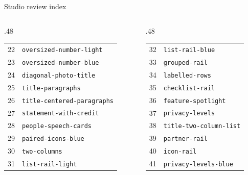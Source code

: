 \documentclass[aspectratio=169]{beamer}
\begin{document}
\begin{frame}{Studio review index}\fontsize{6.5}{9}\selectfont\begin{columns}[T]
\begin{column}{.48\textwidth}\begin{tabular}{rl}
22 & \texttt{oversized-number-light} \\
23 & \texttt{oversized-number-blue} \\
24 & \texttt{diagonal-photo-title} \\
25 & \texttt{title-paragraphs} \\
26 & \texttt{title-centered-paragraphs} \\
27 & \texttt{statement-with-credit} \\
28 & \texttt{people-speech-cards} \\
29 & \texttt{paired-icons-blue} \\
30 & \texttt{two-columns} \\
31 & \texttt{list-rail-light} \\
\end{tabular}\end{column}
\begin{column}{.48\textwidth}\begin{tabular}{rl}
32 & \texttt{list-rail-blue} \\
33 & \texttt{grouped-rail} \\
34 & \texttt{labelled-rows} \\
35 & \texttt{checklist-rail} \\
36 & \texttt{feature-spotlight} \\
37 & \texttt{privacy-levels} \\
38 & \texttt{title-two-column-list} \\
39 & \texttt{partner-rail} \\
40 & \texttt{icon-rail} \\
41 & \texttt{privacy-levels-blue} \\
\end{tabular}\end{column}
\end{columns}\end{frame}
\end{document}
